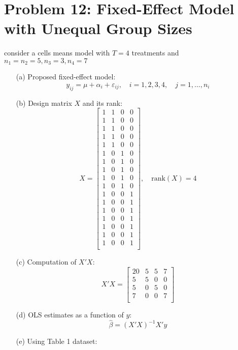 \documentclass[10pt, oneside]{article}
\begin{document}
\section*{Problem 12: Fixed-Effect Model with Unequal Group Sizes}
consider a cells means model with $T=4$ treatments and $n_1=n_2=5,n_3=3,n_4=7$ 
\begin{itemize}
	\item[(a)] Proposed fixed-effect model:
      \[
    y_{ij} = \mu + \alpha_i + \varepsilon_{ij}, \quad i = 1, 2, 3, 4,\quad j = 1, \dots, n_i
  \]
	\item[(b)] Design matrix $X$ and its rank:
      \[
    X = \begin{bmatrix}
      1 & 1 & 0 & 0 \\
      1 & 1 & 0 & 0 \\
      1 & 1 & 0 & 0 \\
      1 & 1 & 0 & 0 \\
      1 & 1 & 0 & 0 \\
      1 & 0 & 1 & 0 \\
      1 & 0 & 1 & 0 \\
      1 & 0 & 1 & 0 \\
      1 & 0 & 1 & 0 \\
      1 & 0 & 1 & 0 \\
      1 & 0 & 0 & 1 \\
      1 & 0 & 0 & 1 \\
      1 & 0 & 0 & 1 \\
      1 & 0 & 0 & 1 \\
      1 & 0 & 0 & 1 \\
      1 & 0 & 0 & 1 \\
      1 & 0 & 0 & 1 \\
    \end{bmatrix}, \quad \text{rank}(X) = 4
  \]
	\item[(c)] Computation of $X'X$:
      \[
    X'X =
    \begin{bmatrix}
      20 & 5 & 5 & 7 \\
      5 & 5 & 0 & 0 \\
      5 & 0 & 5 & 0 \\
      7 & 0 & 0 & 7 \\
    \end{bmatrix}
  \]
	\item[(d)] OLS estimates as a function of $y$:
      \[
    \hat{\beta} = (X'X)^{-1} X'y
  \]
	\item[(e)] Using Table 1 dataset:
	\begin{itemize}

\end{itemize}
\end{itemize}
\end{document}
